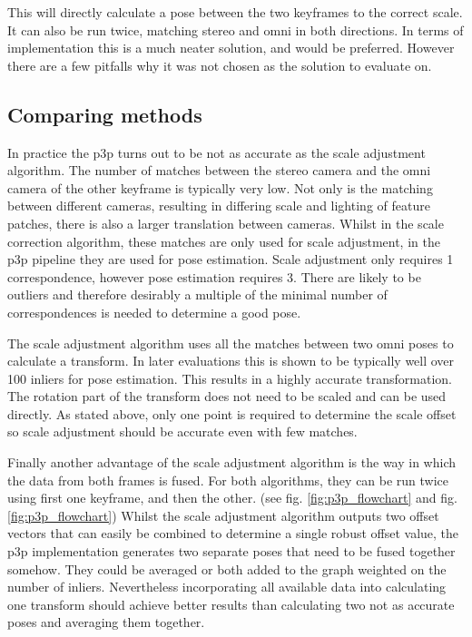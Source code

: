 This will directly calculate a pose between the two keyframes to the correct scale.  It can also be run twice, matching stereo and omni in both directions. In terms of implementation this is a much neater solution, and would be preferred.  However there are a few pitfalls why it was not chosen as the solution to evaluate on.

\subsection{Comparing methods}

In practice the p3p turns out to be not as accurate as the scale adjustment algorithm.  The number of matches between the stereo camera and the omni camera of the other keyframe is typically very low.  Not only is the matching between different cameras, resulting in differing scale and lighting of feature patches, there is also a larger translation between cameras. Whilst in the scale correction algorithm, these matches are only used for scale adjustment, in the p3p pipeline they are used for pose estimation.  Scale adjustment only requires 1 correspondence, however pose estimation requires 3.  There are likely to be outliers and therefore desirably a multiple of the minimal number of correspondences is needed to determine a good pose.

The scale adjustment algorithm uses all the matches between two omni poses to calculate a transform.  In later evaluations this is shown to be typically well over 100 inliers for pose estimation.  This results in a highly accurate transformation.  The rotation part of the transform does not need to be scaled and can be used directly.  As stated above, only one point is required to determine the scale offset so scale adjustment should be accurate even with few matches.

Finally another advantage of the scale adjustment algorithm is the way in which the data from both frames is fused.  For both algorithms, they can be run twice using first one keyframe, and then the other. (see fig. \ref{fig:p3p_flowchart} and fig. \ref{fig:p3p_flowchart})  Whilst the scale adjustment algorithm outputs two offset vectors that can easily be combined to determine a single robust offset value, the p3p implementation generates two separate poses that need to be fused together somehow.  They could be averaged or both added to the graph weighted on the number of inliers. Nevertheless incorporating all available data into calculating one transform should achieve better results than calculating two not as accurate poses and averaging them together.

